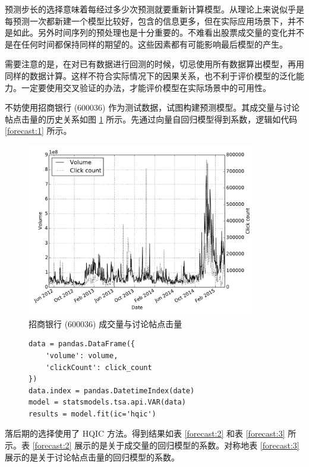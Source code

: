 预测步长的选择意味着每经过多少次预测就要重新计算模型。从理论上来说似乎是每预测一次都新建一个模型比较好，包含的信息更多，但在实际应用场景下，并不是如此。另外时间序列的预处理也是十分重要的。不难看出股票成交量的变化并不是在任何时间都保持同样的期望的。这些因素都有可能影响最后模型的产生。

需要注意的是，在对已有数据进行回测的时候，切忌使用所有数据算出模型，再用同样的数据计算。这样不符合实际情况下的因果关系，也不利于评价模型的泛化能力。一定要使用交叉验证的办法，才能评价模型在实际场景中的可用性。

不妨使用招商银行 (600036) 作为测试数据，试图构建预测模型。其成交量与讨论帖点击量的历史关系如图 \ref{forecast:0} 所示。先通过向量自回归模型得到系数，逻辑如代码 \ref{forecast:1} 所示。

\begin{figure}
  \centering
  \includegraphics[width=0.9\textwidth]{plots/var_forecast_history_line.pdf}
  \caption{招商银行 (600036) 成交量与讨论帖点击量}
  \label{forecast:0}
\end{figure}

\begin{figure}
  \begin{minipage}{\textwidth}
    \begin{lstlisting}[caption=向量自回归模型系数计算, label=forecast:1]
data = pandas.DataFrame({
    'volume': volume,
    'clickCount': click_count
})
data.index = pandas.DatetimeIndex(date)
model = statsmodels.tsa.api.VAR(data)
results = model.fit(ic='hqic')
    \end{lstlisting}
  \end{minipage}
\end{figure}

落后期的选择使用了 HQIC 方法。得到结果如表 \ref{forecast:2} 和表 \ref{forecast:3} 所示。表 \ref{forecast:2} 展示的是关于成交量的回归模型的系数。对称地表 \ref{forecast:3} 展示的是关于讨论帖点击量的回归模型的系数。

